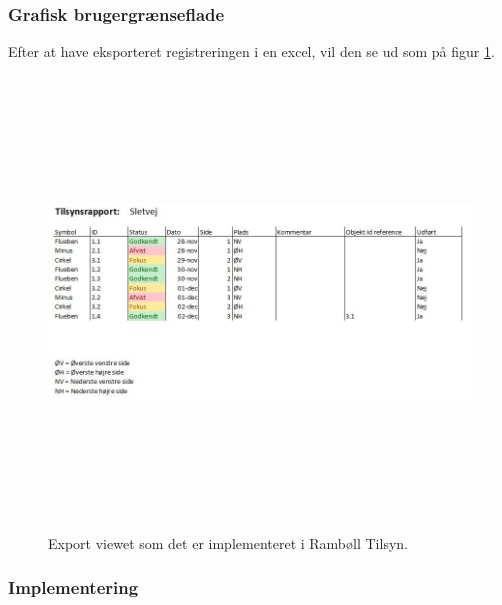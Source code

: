 \subsubsection{Grafisk brugergrænseflade}
Efter at have eksporteret registreringen i en excel, vil den se ud som på figur \ref{fig:Excel}.
\begin{figure}[H] %
	\centering
	\includegraphics[height=12cm, width=17cm]{../ArkitekturDesign/Design/Eksportering/Excel}
	\caption{Export viewet som det er implementeret i Rambøll Tilsyn.}
	\label{fig:Excel}
\end{figure}

\subsubsection{Implementering}

\clearpage